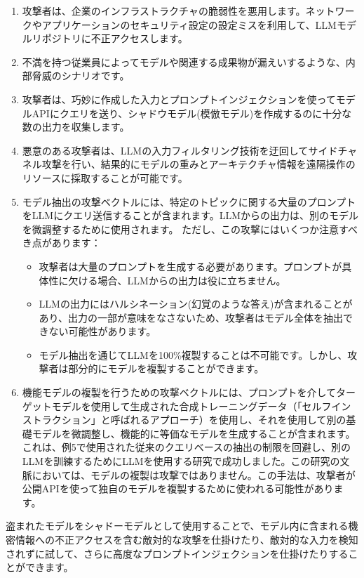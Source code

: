 \documentclass[
]{article}
\providecommand{\tightlist}{%
  \setlength{\itemsep}{0pt}\setlength{\parskip}{0pt}}
\begin{document}
\begin{enumerate}
\def\labelenumi{\arabic{enumi}.}
\tightlist
\item
  攻撃者は、企業のインフラストラクチャの脆弱性を悪用します。ネットワークやアプリケーションのセキュリティ設定の設定ミスを利用して、LLMモデルリポジトリに不正アクセスします。
\item
  不満を持つ従業員によってモデルや関連する成果物が漏えいするような、内部脅威のシナリオです。
\item
  攻撃者は、巧妙に作成した入力とプロンプトインジェクションを使ってモデルAPIにクエリを送り、シャドウモデル(模倣モデル)を作成するのに十分な数の出力を収集します。
\item
  悪意のある攻撃者は、LLMの入力フィルタリング技術を迂回してサイドチャネル攻撃を行い、結果的にモデルの重みとアーキテクチャ情報を遠隔操作のリソースに採取することが可能です。
\item
  モデル抽出の攻撃ベクトルには、特定のトピックに関する大量のプロンプトをLLMにクエリ送信することが含まれます。LLMからの出力は、別のモデルを微調整するために使用されます。
  ただし、この攻撃にはいくつか注意すべき点があります：

  \begin{itemize}
  \tightlist
  \item
    攻撃者は大量のプロンプトを生成する必要があります。プロンプトが具体性に欠ける場合、LLMからの出力は役に立ちません。
  \item
    LLMの出力にはハルシネーション(幻覚のような答え)が含まれることがあり、出力の一部が意味をなさないため、攻撃者はモデル全体を抽出できない可能性があります。
  \item
    モデル抽出を通じてLLMを100\%複製することは不可能です。しかし、攻撃者は部分的にモデルを複製することができます。
  \end{itemize}
\item
  機能モデルの複製を行うための攻撃ベクトルには、プロンプトを介してターゲットモデルを使用して生成された合成トレーニングデータ（「セルフインストラクション」と呼ばれるアプローチ）を使用し、それを使用して別の基礎モデルを微調整し、機能的に等価なモデルを生成することが含まれます。これは、例5で使用された従来のクエリベースの抽出の制限を回避し、別のLLMを訓練するためにLLMを使用する研究で成功しました。この研究の文脈においては、モデルの複製は攻撃ではありません。この手法は、攻撃者が公開APIを使って独自のモデルを複製するために使われる可能性があります。
\end{enumerate}

盗まれたモデルをシャドーモデルとして使用することで、モデル内に含まれる機密情報への不正アクセスを含む敵対的な攻撃を仕掛けたり、敵対的な入力を検知されずに試して、さらに高度なプロンプトインジェクションを仕掛けたりすることができます。
\end{document}
